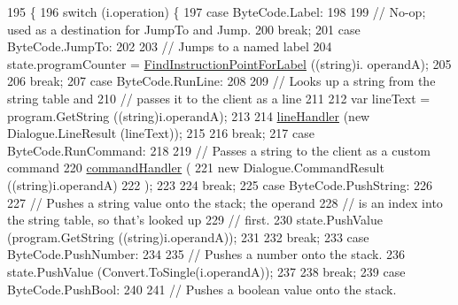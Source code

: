 \begin{DoxyCode}
195                                                     \{
196             \textcolor{keywordflow}{switch} (i.operation) \{
197             \textcolor{keywordflow}{case} ByteCode.Label:
198 
199                 \textcolor{comment}{// No-op; used as a destination for JumpTo and Jump.}
200                 \textcolor{keywordflow}{break};
201             \textcolor{keywordflow}{case} ByteCode.JumpTo:
202 
203                 \textcolor{comment}{// Jumps to a named label}
204                 state.programCounter = \hyperlink{a00086_af613c8b2d098678b6ea05b509c0a0cb6}{FindInstructionPointForLabel} ((\textcolor{keywordtype}{string})i.
      operandA);
205 
206                 \textcolor{keywordflow}{break};
207             \textcolor{keywordflow}{case} ByteCode.RunLine:
208 
209                 \textcolor{comment}{// Looks up a string from the string table and}
210                 \textcolor{comment}{// passes it to the client as a line}
211 
212                 var lineText = program.GetString ((string)i.operandA);
213 
214                 \hyperlink{a00086_a29b30454f068fc7e107d48bff4346fd9}{lineHandler} (\textcolor{keyword}{new} Dialogue.LineResult (lineText));
215 
216                 \textcolor{keywordflow}{break};
217             \textcolor{keywordflow}{case} ByteCode.RunCommand:
218 
219                 \textcolor{comment}{// Passes a string to the client as a custom command}
220                 \hyperlink{a00086_ab89b02227b92c74552f719afd47848e4}{commandHandler} (
221                     \textcolor{keyword}{new} Dialogue.CommandResult ((\textcolor{keywordtype}{string})i.operandA)
222                 );
223 
224                 \textcolor{keywordflow}{break};
225             \textcolor{keywordflow}{case} ByteCode.PushString:
226 
227                 \textcolor{comment}{// Pushes a string value onto the stack; the operand}
228                 \textcolor{comment}{// is an index into the string table, so that's looked up}
229                 \textcolor{comment}{// first.}
230                 state.PushValue (program.GetString ((string)i.operandA));
231 
232                 \textcolor{keywordflow}{break};
233             \textcolor{keywordflow}{case} ByteCode.PushNumber:
234 
235                 \textcolor{comment}{// Pushes a number onto the stack.}
236                 state.PushValue (Convert.ToSingle(i.operandA));
237 
238                 \textcolor{keywordflow}{break};
239             \textcolor{keywordflow}{case} ByteCode.PushBool:
240 
241                 \textcolor{comment}{// Pushes a boolean value onto the stack.}

\end{DoxyCode}
